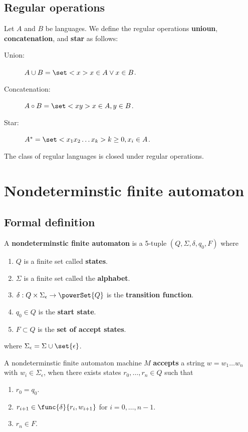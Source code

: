 \subsection{Regular operations}
\begin{definition}
    Let \(A\) and \(B\) be languages. We define the regular operations \textbf{unioun}, \textbf{concatenation}, and \textbf{star} as follows:
    \begin{description}
        \item[Union:] \(A \cup B = \set<x>{x \in A \lor x \in B}\).
        \item[Concatenation:] \(A \circ B = \set<xy>{x \in A, y \in B}\).
        \item[Star:] \(A^{\ast} = \set<x_1x_2\dots x_k>{k \geq 0, x_i \in A}\).   
    \end{description}
\end{definition}

\begin{theorem}
    The class of regular languages is closed under regular operations.
\end{theorem}

\section{Nondeterminstic finite automaton}
\subsection{Formal definition}
\begin{definition}
    A \textbf{nondeterminstic finite automaton} is a 5-tuple \((Q,\Sigma, \delta, q_0, F)\) where
    \begin{enumerate}
        \item \(Q\) is a finite set called \textbf{states}.
        \item \(\Sigma\) is a finite set called the \textbf{alphabet}.
        \item \(\delta: Q \times \Sigma_{\epsilon} \to \powerSet{Q}\) is the \textbf{transition function}.
        \item \(q_0 \in Q\) is the \textbf{start state}.
        \item \(F \subset Q\) is the \textbf{set of accept states}.
    \end{enumerate}
    where \(\Sigma_{\epsilon} = \Sigma \cup \set{\epsilon}\).
\end{definition}
A nondeterminstic finite automaton machine \(M\) \textbf{accepts} a string \(w = w_1\dots w_n\) with \(w_i \in \Sigma_{\epsilon}\), when there exists states \(r_0 , \dots , r_n \in Q\) such that 
\begin{enumerate}
    \item \(r_0 = q_0\).
    \item \(r_{i+1} \in \func{\delta}{r_i, w_{i+1}}\) for \(i = 0, \dots, n-1\).
    \item \(r_n \in F\).
\end{enumerate}

